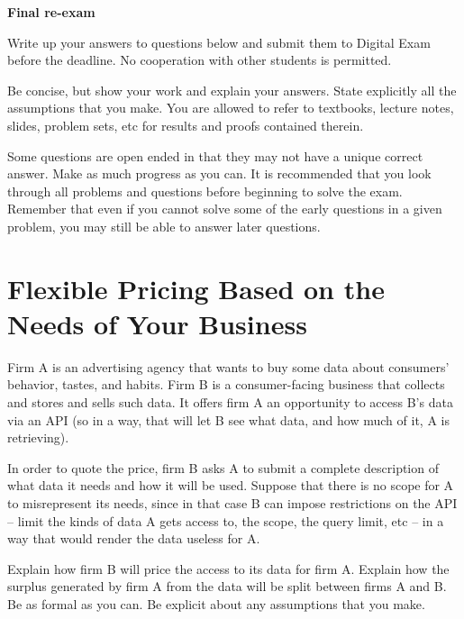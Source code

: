 \documentclass[a4paper]{article}
\newif\ifsolutions
\begin{document}
{\ifsolutions \else	
	
\fi}

\begin{center}
		\LARGE\textbf{Final re-exam {\ifsolutions solutions \fi}}
\end{center}

{\ifsolutions \else	
Write up your answers to questions below and submit them to Digital Exam before the deadline. No cooperation with other students is permitted.

Be concise, but show your work and explain your answers. State explicitly all the assumptions that you make. You are allowed to refer to textbooks, lecture notes, slides, problem sets, etc for results and proofs contained therein.

Some questions are open ended in that they may not have a unique correct answer. Make as much progress as you can. It is recommended that you look through all problems and questions before beginning to solve the exam. Remember that even if you cannot solve some of the early questions in a given problem, you may still be able to answer later questions. 
\fi}




\section{Flexible Pricing Based on the Needs of Your Business}

Firm A is an advertising agency that wants to buy some data about consumers' behavior, tastes, and habits. Firm B is a consumer-facing business that collects and stores and sells such data. It offers firm A an opportunity to access B's data via an API (so in a way, that will let B see what data, and how much of it, A is retrieving).

In order to quote the price, firm B asks A to submit a complete description of what data it needs and how it will be used. Suppose that there is no scope for A to misrepresent its needs, since in that case B can impose restrictions on the API -- limit the kinds of data A gets access to, the scope, the query limit, etc -- in a way that would render the data useless for A.

Explain how firm B will price the access to its data for firm A. Explain how the surplus generated by firm A from the data will be split between firms A and B. Be as formal as you can. Be explicit about any assumptions that you make.

\ifsolutions
\end{document}
